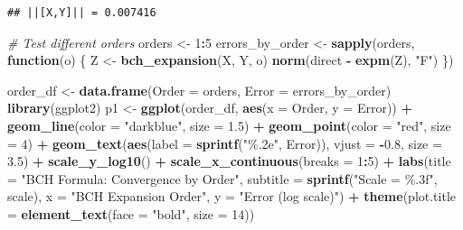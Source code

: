 \documentclass[
]{book}
\newenvironment{Shaded}{\begin{snugshade}}{\end{snugshade}}
\newcommand{\AttributeTok}[1]{\textcolor[rgb]{0.13,0.29,0.53}{#1}}
\newcommand{\CommentTok}[1]{\textcolor[rgb]{0.56,0.35,0.01}{\textit{#1}}}
\newcommand{\ControlFlowTok}[1]{\textcolor[rgb]{0.13,0.29,0.53}{\textbf{#1}}}
\newcommand{\DecValTok}[1]{\textcolor[rgb]{0.00,0.00,0.81}{#1}}
\newcommand{\FloatTok}[1]{\textcolor[rgb]{0.00,0.00,0.81}{#1}}
\newcommand{\FunctionTok}[1]{\textcolor[rgb]{0.13,0.29,0.53}{\textbf{#1}}}
\newcommand{\NormalTok}[1]{#1}
\newcommand{\OtherTok}[1]{\textcolor[rgb]{0.56,0.35,0.01}{#1}}
\newcommand{\SpecialCharTok}[1]{\textcolor[rgb]{0.81,0.36,0.00}{\textbf{#1}}}
\newcommand{\StringTok}[1]{\textcolor[rgb]{0.31,0.60,0.02}{#1}}
\theoremstyle{definition}
\theoremstyle{definition}
\theoremstyle{definition}
\theoremstyle{definition}
\theoremstyle{remark}
\begin{document}
\begin{verbatim}
## ||[X,Y]|| = 0.007416
\end{verbatim}

\begin{Shaded}
\begin{Highlighting}[]
\CommentTok{\# Test different orders}
\NormalTok{orders }\OtherTok{\textless{}{-}} \DecValTok{1}\SpecialCharTok{:}\DecValTok{5}
\NormalTok{errors\_by\_order }\OtherTok{\textless{}{-}} \FunctionTok{sapply}\NormalTok{(orders, }\ControlFlowTok{function}\NormalTok{(o) \{}
\NormalTok{  Z }\OtherTok{\textless{}{-}} \FunctionTok{bch\_expansion}\NormalTok{(X, Y, o)}
  \FunctionTok{norm}\NormalTok{(direct }\SpecialCharTok{{-}} \FunctionTok{expm}\NormalTok{(Z), }\StringTok{"F"}\NormalTok{)}
\NormalTok{\})}

\NormalTok{order\_df }\OtherTok{\textless{}{-}} \FunctionTok{data.frame}\NormalTok{(}\AttributeTok{Order =}\NormalTok{ orders, }\AttributeTok{Error =}\NormalTok{ errors\_by\_order)}
\FunctionTok{library}\NormalTok{(ggplot2)}
\NormalTok{p1 }\OtherTok{\textless{}{-}} \FunctionTok{ggplot}\NormalTok{(order\_df, }\FunctionTok{aes}\NormalTok{(}\AttributeTok{x =}\NormalTok{ Order, }\AttributeTok{y =}\NormalTok{ Error)) }\SpecialCharTok{+}
  \FunctionTok{geom\_line}\NormalTok{(}\AttributeTok{color =} \StringTok{"darkblue"}\NormalTok{, }\AttributeTok{size =} \FloatTok{1.5}\NormalTok{) }\SpecialCharTok{+}
  \FunctionTok{geom\_point}\NormalTok{(}\AttributeTok{color =} \StringTok{"red"}\NormalTok{, }\AttributeTok{size =} \DecValTok{4}\NormalTok{) }\SpecialCharTok{+}
  \FunctionTok{geom\_text}\NormalTok{(}\FunctionTok{aes}\NormalTok{(}\AttributeTok{label =} \FunctionTok{sprintf}\NormalTok{(}\StringTok{"\%.2e"}\NormalTok{, Error)), }
            \AttributeTok{vjust =} \SpecialCharTok{{-}}\FloatTok{0.8}\NormalTok{, }\AttributeTok{size =} \FloatTok{3.5}\NormalTok{) }\SpecialCharTok{+}
  \FunctionTok{scale\_y\_log10}\NormalTok{() }\SpecialCharTok{+}
  \FunctionTok{scale\_x\_continuous}\NormalTok{(}\AttributeTok{breaks =} \DecValTok{1}\SpecialCharTok{:}\DecValTok{5}\NormalTok{) }\SpecialCharTok{+}
  \FunctionTok{labs}\NormalTok{(}\AttributeTok{title =} \StringTok{"BCH Formula: Convergence by Order"}\NormalTok{,}
       \AttributeTok{subtitle =} \FunctionTok{sprintf}\NormalTok{(}\StringTok{"Scale = \%.3f"}\NormalTok{, scale),}
       \AttributeTok{x =} \StringTok{"BCH Expansion Order"}\NormalTok{,}
       \AttributeTok{y =} \StringTok{"Error (log scale)"}\NormalTok{) }\SpecialCharTok{+}
  \FunctionTok{theme}\NormalTok{(}\AttributeTok{plot.title =} \FunctionTok{element\_text}\NormalTok{(}\AttributeTok{face =} \StringTok{"bold"}\NormalTok{, }\AttributeTok{size =} \DecValTok{14}\NormalTok{))}


\end{Highlighting}
\end{Shaded}
\end{document}
